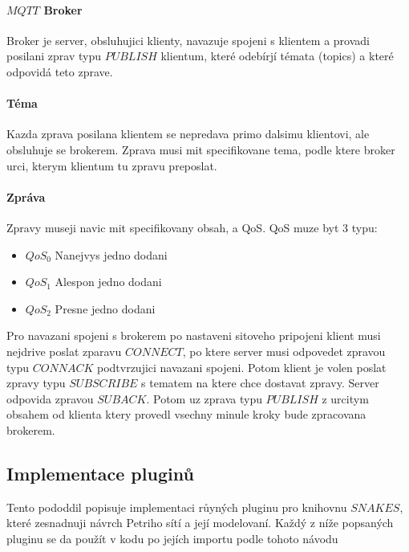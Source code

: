 \paragraph{$MQTT$ Broker}

Broker je server, obsluhujici klienty, navazuje spojeni s klientem a provadi posilani zprav typu $PUBLISH$ klientum, které odebírjí témata (topics) a které odpovidá teto zprave.

\paragraph{Téma}

Kazda zprava posilana klientem se nepredava primo dalsimu klientovi, ale obsluhuje se brokerem. Zprava musi mit specifikovane tema, podle ktere broker urci, kterym klientum tu zpravu preposlat.

\paragraph{Zpráva}

Zpravy museji navic mit specifikovany obsah, a QoS. QoS muze byt 3 typu:
\begin{itemize}
  \item $QoS_0$ Nanejvys jedno dodani \\
  \item $QoS_1$ Alespon jedno dodani \\
  \item $QoS_2$ Presne jedno dodani 
\end{itemize}

Pro navazani spojeni s brokerem po nastaveni sitoveho pripojeni klient musi nejdrive poslat zparavu $CONNECT$, po ktere server musi odpovedet zpravou typu $CONNACK$ podtvrzujici navazani spojeni. Potom klient je volen poslat zpravy typu $SUBSCRIBE$ s tematem na ktere chce dostavat zpravy. Server odpovida zpravou $SUBACK$. Potom uz zprava typu $PUBLISH$ z urcitym obsahem od klienta ktery provedl vsechny minule kroky bude zpracovana brokerem.

\subsection{Implementace pluginů}
\label{sec:plug-impl}
Tento pododdil popisuje implementaci růyných pluginu pro knihovnu $SNAKES$, které zesnadnuji návrch Petriho sítí a její modelovaní. Každý z níže popsaných pluginu se da  použít v kodu po jejích importu podle tohoto návodu 

